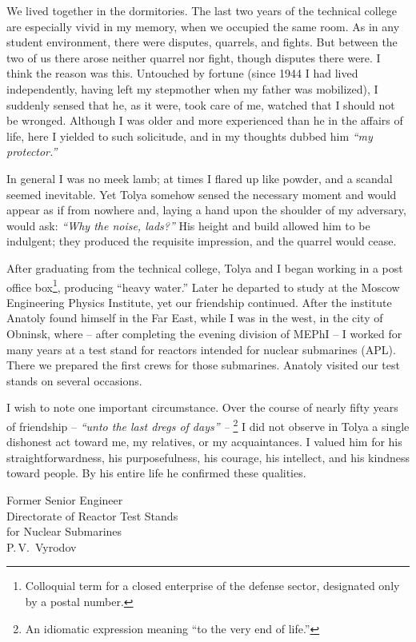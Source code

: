 \documentclass[openright]{bookest}
\begin{document}
We lived together in the dormitories. The last two years of the technical college are especially vivid in my memory, when we occupied the same room. As in any student environment, there were disputes, quarrels, and fights. But between the two of us there arose neither quarrel nor fight, though disputes there were. I think the reason was this. Untouched by fortune (since 1944 I had lived independently, having left my stepmother when my father was mobilized), I suddenly sensed that he, as it were, took care of me, watched that I should not be wronged. Although I was older and more experienced than he in the affairs of life, here I yielded to such solicitude, and in my thoughts dubbed him \textit{``my protector.''}

In general I was no meek lamb; at times I flared up like powder, and a scandal seemed inevitable. Yet Tolya somehow sensed the necessary moment and would appear as if from nowhere and, laying a hand upon the shoulder of my adversary, would ask: \textit{``Why the noise, lads?''} His height and build allowed him to be indulgent; they produced the requisite impression, and the quarrel would cease.

After graduating from the technical college, Tolya and I began working in a post office box\footnote{Colloquial term for a closed enterprise of the defense sector, designated only by a postal number.}, producing ``heavy water.'' Later he departed to study at the Moscow Engineering Physics Institute, yet our friendship continued. After the institute Anatoly found himself in the Far East, while I was in the west, in the city of Obninsk, where -- after completing the evening division of MEPhI -- I worked for many years at a test stand for reactors intended for nuclear submarines (APL). There we prepared the first crews for those submarines. Anatoly visited our test stands on several occasions.

I wish to note one important circumstance. Over the course of nearly fifty years of friendship -- \textit{``unto the last dregs of days'' -- }\footnote{An idiomatic expression meaning ``to the very end of life.''} I did not observe in Tolya a single dishonest act toward me, my relatives, or my acquaintances. I valued him for his straightforwardness, his purposefulness, his courage, his intellect, and his kindness toward people. By his entire life he confirmed these qualities.

\begin{flushright}
Former Senior Engineer\\
Directorate of Reactor Test Stands\\
for Nuclear Submarines\\[0.5\baselineskip]
P.\,V.~Vyrodov
\end{flushright}
\end{document}
